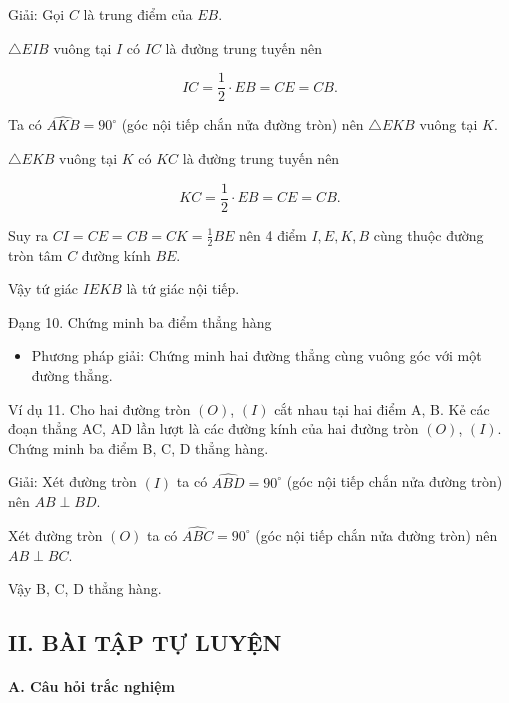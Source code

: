 \documentclass[%
    fontsize=12pt,%
    chapterprefix=false,%
    open=right,%
    twoside=false,%
    numbers=noenddot,%
    headings=optiontohead,%
    final,%
    DIV=15,%
    parskip=half %
]{scrbook}
\begin{document}
Giải: Gọi $C$ là trung điểm của $EB$.

$\triangle EIB$ vuông tại $I$ có $IC$ là đường trung tuyến nên

\[ IC = \frac{1}{2} \cdot EB = CE = CB. \]

Ta có $\widehat{AKB} = 90^\circ$ (góc nội tiếp chắn nửa đường tròn) nên $\triangle EKB$ vuông tại $K$.

$\triangle EKB$ vuông tại $K$ có $KC$ là đường trung tuyến nên

\[ KC = \frac{1}{2} \cdot EB = CE = CB. \]

Suy ra $CI = CE = CB = CK = \frac{1}{2} BE$ nên 4 điểm $I, E, K, B$ cùng thuộc đường tròn tâm $C$ đường kính $BE$.

Vậy tứ giác $IEKB$ là tứ giác nội tiếp.


Đạng 10. Chứng minh ba điểm thẳng hàng

\begin{itemize}
  \item Phương pháp giải: Chứng minh hai đường thẳng cùng vuông góc với một đường thẳng.
\end{itemize}

Ví dụ 11. Cho hai đường tròn $(O)$, $(I)$ cắt nhau tại hai điểm A, B. Kẻ các đoạn thẳng AC, AD lần lượt là các đường kính của hai đường tròn $(O)$, $(I)$. Chứng minh ba điểm B, C, D thẳng hàng.

Giải: Xét đường tròn $(I)$ ta có $ \widehat{ABD} = 90^\circ $ (góc nội tiếp chắn nửa đường tròn) nên $ AB \perp BD $.

Xét đường tròn $(O)$ ta có $ \widehat{ABC} = 90^\circ $ (góc nội tiếp chắn nửa đường tròn) nên $ AB \perp BC $.

Vậy B, C, D thẳng hàng.
\subsection{II. BÀI TẬP TỰ LUYỆN}
\paragraph{A. Câu hỏi trắc nghiệm}
\end{document}

